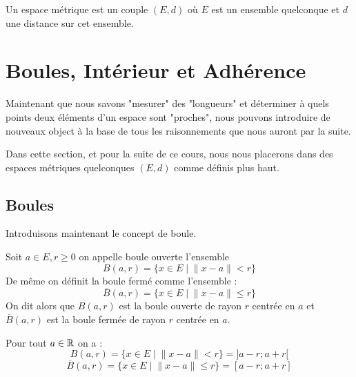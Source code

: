 \begin{definition}
    Un espace métrique est un couple $(E,d)$ où $E$ est un ensemble quelconque et $d$ une distance 
    sur cet ensemble.
\end{definition}


\section{Boules, Intérieur et Adhérence}

Maintenant que nous savons "mesurer" des "longueurs" et déterminer à quels points deux éléments d'un espace sont 
"proches", nous pouvons introduire de nouveaux object à la base de tous les raisonnements que nous auront par la suite. 

Dans cette section, et pour la suite de ce cours, nous nous placerons dans des espaces métriques quelconques $(E,d)$ 
comme définis plus haut. 

\subsection{Boules}

Introduisons maintenant le concept de boule. 

\begin{definition}
    Soit $a \in E, r \geqslant 0$ on appelle {boule ouverte} l'ensemble 
        \[ B(a,r) = \{ x \in E \; | \; \| x - a\| <  r\} \] 
    De même on définit la boule fermé comme l'ensemble :
    \[ \overline{B}(a,r) = \{ x \in E \; | \; \| x - a\| \leqslant r\} \] 
    On dit alors que $B(a,r)$ est la boule ouverte de rayon $r$ centrée en $a$ et 
    $\overline{B}(a,r)$ est la boule fermée de rayon $r$ centrée en $a$. 
\end{definition}

\begin{example}
    Pour tout $a \in \mathbb{R}$ on a :
        \[B(a,r) = \{ x \in E \; | \; \| x - a\| <  r\} = ]a - r ; a + r [ \]
        \[\overline{B}(a,r) = \{ x \in E \; | \; \| x - a\| \leqslant  r\} = [a - r ; a + r ] \]
\end{example}   

